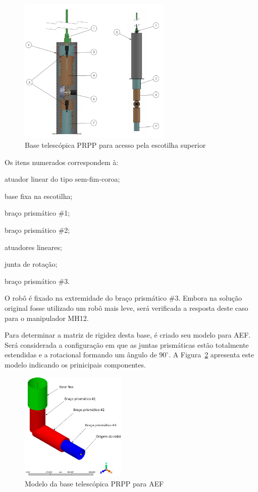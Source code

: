 \begin{figure}[h]
	\centering 
 	\includegraphics[width=0.65\textwidth]{figs/base_telesc}
 	\caption{Base telescópica PRPP para acesso pela escotilha superior}
 	\label{fig::base_telesc}
\end{figure}

Os itens numerados correspondem à: 
%
\begin{enumerate*}[label=(\arabic*)]
  \item atuador linear do tipo sem-fim-coroa;
  \item base fixa na escotilha;
  \item braço prismático \#1;
  \item braço prismático \#2;
  \item atuadores lineares;
  \item junta de rotação;
  \item braço prismático \#3.
\end{enumerate*}
%

O robô é fixado na extremidade do braço prismático \#3. Embora na solução
original fosse utilizado um robô mais leve, será verificada a resposta
deste caso para o manipulador MH12.

Para determinar a matriz de rigidez desta base, é criado seu modelo para AEF.
Será considerada a configuração em que as juntas prismáticas estão totalmente
estendidas e a rotacional formando um ângulo de $90^\circ$. A
Figura~\ref{fig::base_telesc_fea} apresenta este modelo indicando os prinicipais
componentes.

\begin{figure}[h]
	\centering 
 	\includegraphics[width=0.45\textwidth]{figs/base_telesc_fea}
 	\caption{Modelo da base telescópica PRPP para AEF}
 	\label{fig::base_telesc_fea}
\end{figure}

